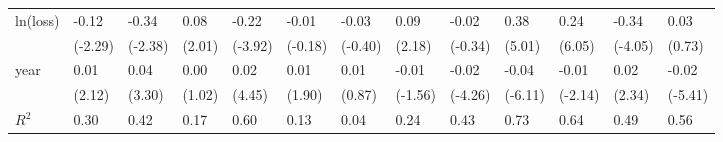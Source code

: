 \begin{tabular}{p{1.5cm} p{1.7cm} p{1.7cm} p{1.7cm}  p{1.7cm} p{1.7cm} p{1.7cm} p{1.7cm} p{1.7cm}  p{1.7cm} p{1.7cm} p{1.7cm} p{1.7cm} }
\hline
ln(loss)        &    -0.12\sym{*}  &    -0.34\sym{*}  &     0.08         &    -0.22\sym{***}&    -0.01         &    -0.03         &     0.09\sym{*}  &    -0.02         &     0.38\sym{***}&     0.24\sym{***}&    -0.34\sym{***}&     0.03         \\
                &  (-2.29)         &  (-2.38)         &   (2.01)         &  (-3.92)         &  (-0.18)         &  (-0.40)         &   (2.18)         &  (-0.34)         &   (5.01)         &   (6.05)         &  (-4.05)         &   (0.73)         \\
year            &     0.01\sym{*}  &     0.04\sym{**} &     0.00         &     0.02\sym{***}&     0.01         &     0.01         &    -0.01         &    -0.02\sym{***}&    -0.04\sym{***}&    -0.01\sym{*}  &     0.02\sym{*}  &    -0.02\sym{***}\\
                &   (2.12)         &   (3.30)         &   (1.02)         &   (4.45)         &   (1.90)         &   (0.87)         &  (-1.56)         &  (-4.26)         &  (-6.11)         &  (-2.14)         &   (2.34)         &  (-5.41)         \\
\hline
\(R^{2}\)       &     0.30         &     0.42         &     0.17         &     0.60         &     0.13         &     0.04         &     0.24         &     0.43         &     0.73         &     0.64         &     0.49         &     0.56         \\
\end{tabular}
\def\sym#1{\ifmmode^{#1}\else\(^{#1}\)\fi}
